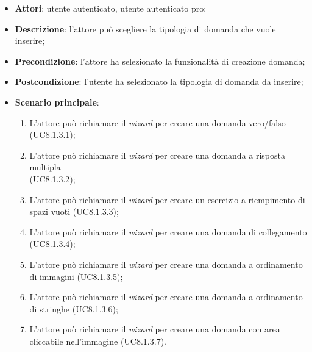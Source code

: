 	\begin{itemize}
		\item
			\textbf{Attori}: utente autenticato, utente autenticato pro;
		\item
			\textbf{Descrizione}: l'attore può scegliere la tipologia di domanda che vuole inserire;
		\item		
			\textbf{Precondizione}: l'attore ha selezionato la funzionalità di creazione domanda;
		\item
			\textbf{Postcondizione}: l'utente ha selezionato la tipologia di domanda da inserire;
				\item \textbf{Scenario principale}: 
					\begin{enumerate}
					\item
					L'attore può richiamare il \textit{wizard} per creare una domanda vero/falso (UC8.1.3.1);
					\item
					L'attore può richiamare il \textit{wizard} per creare una domanda a risposta multipla \\(UC8.1.3.2);
					\item
					L'attore può richiamare il \textit{wizard} per creare un esercizio a riempimento di spazi vuoti (UC8.1.3.3);
					\item
					L'attore può richiamare il \textit{wizard} per creare una domanda di collegamento (UC8.1.3.4);
					\item
					L'attore può richiamare il \textit{wizard} per creare una domanda a ordinamento di immagini (UC8.1.3.5);
					\item
					L'attore può richiamare il \textit{wizard} per creare una domanda a ordinamento di stringhe (UC8.1.3.6);
					\item
					L'attore può richiamare il \textit{wizard} per creare una domanda con area cliccabile nell'immagine (UC8.1.3.7).
	 			\end{enumerate}
	\end{itemize}










